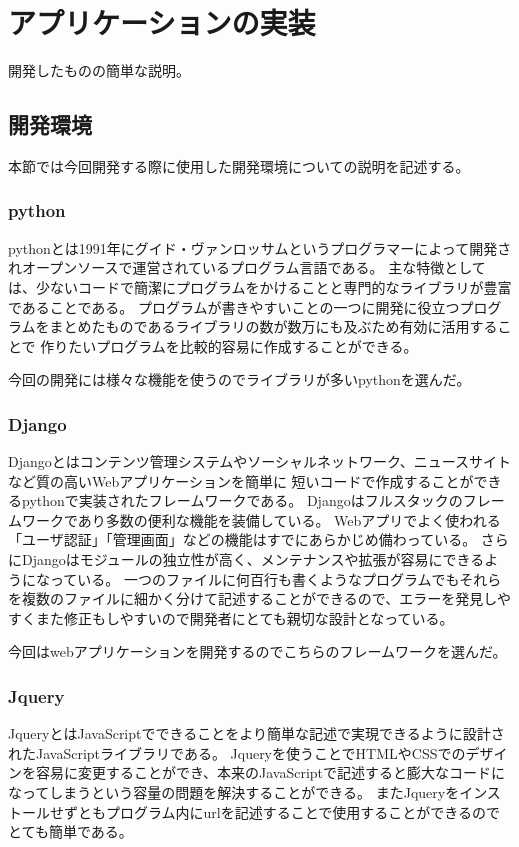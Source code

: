 \chapter{アプリケーションの実装}
\label{cha:Development}
開発したものの簡単な説明。

\section{開発環境}
本節では今回開発する際に使用した開発環境についての説明を記述する。

\subsection{python}
python\cite{python}とは1991年にグイド・ヴァンロッサムというプログラマーによって開発されオープンソースで運営されているプログラム言語である。
主な特徴としては、少ないコードで簡潔にプログラムをかけることと専門的なライブラリが豊富であることである。
プログラムが書きやすいことの一つに開発に役立つプログラムをまとめたものであるライブラリの数が数万にも及ぶため有効に活用することで
作りたいプログラムを比較的容易に作成することができる。

今回の開発には様々な機能を使うのでライブラリが多いpythonを選んだ。

\subsection{Django}
Django\cite{django}とはコンテンツ管理システムやソーシャルネットワーク、ニュースサイトなど質の高いWebアプリケーションを簡単に
短いコードで作成することができるpythonで実装されたフレームワークである。
Djangoはフルスタックのフレームワークであり多数の便利な機能を装備している。
Webアプリでよく使われる「ユーザ認証」「管理画面」などの機能はすでにあらかじめ備わっている。
さらにDjangoはモジュールの独立性が高く、メンテナンスや拡張が容易にできるようになっている。
一つのファイルに何百行も書くようなプログラムでもそれらを複数のファイルに細かく分けて記述することができるので、エラーを発見しやすくまた修正もしやすいので開発者にとても親切な設計となっている。

今回はwebアプリケーションを開発するのでこちらのフレームワークを選んだ。

\subsection{Jquery}
Jquery\cite{jQuery}とはJavaScriptでできることをより簡単な記述で実現できるように設計されたJavaScriptライブラリである。
Jqueryを使うことでHTMLやCSSでのデザインを容易に変更することができ、本来のJavaScriptで記述すると膨大なコードになってしまうという容量の問題を解決することができる。
またJqueryをインストールせずともプログラム内にurlを記述することで使用することができるのでとても簡単である。

